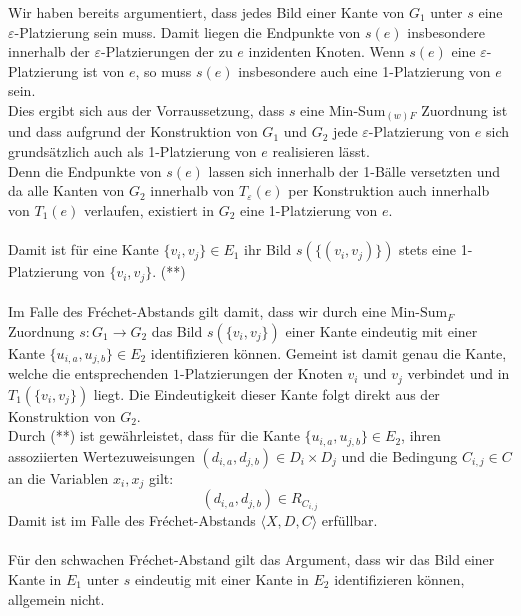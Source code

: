 \documentclass[a4paper, 12pt, twoside]{article}
\theoremstyle{Format1} %
\begin{document}
Wir haben bereits argumentiert, dass jedes Bild einer Kante von $G_1$ unter $s$ eine $\varepsilon$-Platzierung sein muss.
Damit liegen die Endpunkte von $s(e)$ insbesondere innerhalb der $\varepsilon$-Platzierungen der zu $e$ inzidenten Knoten.
Wenn $s(e)$ eine $\varepsilon$-Platzierung ist von $e$, so muss $s(e)$ insbesondere auch eine 1-Platzierung von $e$ sein.
\\
Dies ergibt sich aus der Vorraussetzung, dass $s$ eine Min-Sum$_{(w)F}$ Zuordnung ist und dass aufgrund der Konstruktion
von $G_1$ und $G_2$ jede $\varepsilon$-Platzierung von $e$ sich grundsätzlich auch als 1-Platzierung von $e$ realisieren lässt.
\\
Denn die Endpunkte von $s(e)$ lassen sich innerhalb der 1-Bälle versetzten und da alle Kanten von $G_2$ innerhalb von $T_{\varepsilon}(e)$
per Konstruktion auch innerhalb von $T_1(e)$ verlaufen, existiert in $G_2$ eine 1-Platzierung von $e$.
\\
\\
Damit ist für eine Kante $\{v_i, v_j\} \in E_1$ ihr Bild $s(\{(v_i, v_j)\})$ stets eine 1-Platzierung von $\{v_i, v_j\}$. (**)
\\
\\
Im Falle des Fréchet-Abstands gilt damit, dass wir durch eine $\text{Min-Sum}_F$ Zuordnung $s: G_1 \to G_2$ das Bild $s(\{v_i, v_j\})$ einer Kante
eindeutig mit einer Kante $\{u_{i,a}, u_{j,b}\} \in E_2$ identifizieren können. Gemeint ist damit genau die Kante, welche
die entsprechenden $1$-Platzierungen der Knoten $v_i$ und $v_j$ verbindet und in $T_1(\{v_i, v_j\})$ liegt. Die Eindeutigkeit dieser Kante folgt direkt aus der
Konstruktion von $G_2$.
\\
Durch (**) ist gewährleistet, dass für die Kante $\{u_{i,a}, u_{j,b}\} \in E_2$, ihren assoziierten Wertezuweisungen $(d_{i,a}, d_{j,b}) \in D_i \times D_j$
und die Bedingung $C_{i,j} \in C$ an die Variablen $x_i, x_j$ gilt:
$$(d_{i,a},d_{j,b}) \in R_{C_{i,j}}$$
Damit ist im Falle des Fréchet-Abstands $\langle X,D,C \rangle$ erfüllbar.
\\
\\
Für den schwachen Fréchet-Abstand gilt das Argument, dass wir das Bild einer Kante in $E_1$ unter $s$ eindeutig mit einer Kante in $E_2$ identifizieren können, allgemein nicht.
\end{document}
